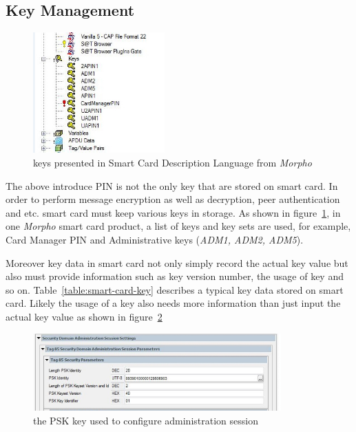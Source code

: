 \subsection{Key Management} \label{labelKeyManagement}

 \begin{figure}[!htbp]
	\centering
	\includegraphics[width=0.45\textwidth]{smart-card-key.jpg}
		\caption{keys presented in Smart Card Description Language from \emph{Morpho}}
	\label{fig:smart-card-key}
\end{figure}

The above introduce PIN is not the only key that are stored on smart card. In order to perform message encryption as well as decryption, peer authentication and etc. smart card must keep various keys in storage. As shown in figure~\ref{fig:smart-card-key}, in one \emph{Morpho} smart card product, a list of keys and key sets are used, for example, Card Manager PIN and Administrative keys (\emph{ADM1, ADM2, ADM5}).

Moreover key data in smart card not only simply record the actual key value but also must provide information such as key version number, the usage of key and so on. Table~\ref{table:smart-card-key} describes a typical key data stored on smart card. Likely the usage of a key also needs more information than just input the actual key value as shown in figure~\ref{fig:smart-card-key-use}

 \begin{figure}[!htbp]
	\centering
	\includegraphics[width=0.85\textwidth]{smart-card-key-use.jpg}
		\caption{the PSK key used to configure administration session}
	\label{fig:smart-card-key-use}
\end{figure}

